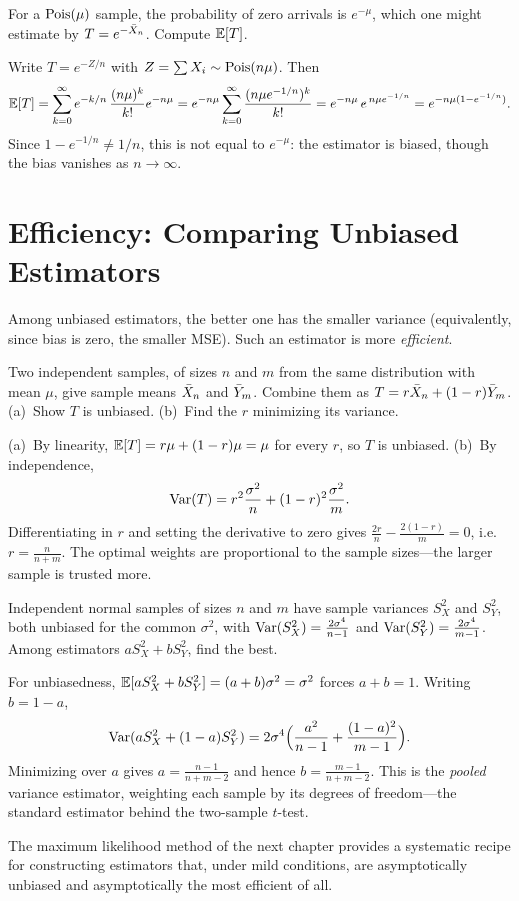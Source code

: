 \begin{example}
For a $\mathrm{Pois}(\mu)$ sample, the probability of zero arrivals is $e^{-\mu}$, which
one might estimate by $T=e^{-\bar{X}_n}$. Compute $\mathbb{E}[T]$.

\solution Write $T=e^{-Z/n}$ with $Z=\sum X_i\sim\mathrm{Pois}(n\mu)$. Then
\[
  \mathbb{E}[T]=\sum_{k=0}^\infty e^{-k/n}\,\frac{(n\mu)^k}{k!}e^{-n\mu}
   =e^{-n\mu}\sum_{k=0}^\infty\frac{(n\mu e^{-1/n})^k}{k!}
   =e^{-n\mu}\,e^{\,n\mu e^{-1/n}}=e^{-n\mu(1-e^{-1/n})}.
\]
Since $1-e^{-1/n}\neq 1/n$, this is not equal to $e^{-\mu}$: the estimator is
biased, though the bias vanishes as $n\to\infty$.
\end{example}

\section{Efficiency: Comparing Unbiased Estimators}

Among unbiased estimators, the better one has the smaller variance (equivalently,
since bias is zero, the smaller MSE). Such an estimator is more \emph{efficient}.

\begin{example}
Two independent samples, of sizes $n$ and $m$ from the same distribution with
mean $\mu$, give sample means $\bar{X}_n$ and $\bar{Y}_m$. Combine them as
$T=r\bar{X}_n+(1-r)\bar{Y}_m$. (a)~Show $T$ is unbiased. (b)~Find the $r$ minimizing
its variance.

\solution (a)~By linearity, $\mathbb{E}[T]=r\mu+(1-r)\mu=\mu$ for every $r$, so $T$ is
unbiased. (b)~By independence,
\[
  \mathrm{Var}(T)=r^2\frac{\sigma^2}{n}+(1-r)^2\frac{\sigma^2}{m}.
\]
Differentiating in $r$ and setting the derivative to zero gives
$\tfrac{2r}{n}-\tfrac{2(1-r)}{m}=0$, i.e.\ $r=\tfrac{n}{n+m}$. The optimal weights
are proportional to the sample sizes—the larger sample is trusted more.
\end{example}

\begin{example}
Independent normal samples of sizes $n$ and $m$ have sample variances $S_X^2$
and $S_Y^2$, both unbiased for the common $\sigma^2$, with
$\mathrm{Var}(S_X^2)=\tfrac{2\sigma^4}{n-1}$ and $\mathrm{Var}(S_Y^2)=\tfrac{2\sigma^4}{m-1}$.
Among estimators $aS_X^2+bS_Y^2$, find the best.

\solution For unbiasedness, $\mathbb{E}[aS_X^2+bS_Y^2]=(a+b)\sigma^2=\sigma^2$ forces
$a+b=1$. Writing $b=1-a$,
\[
  \mathrm{Var}(aS_X^2+(1-a)S_Y^2)=2\sigma^4\Bigl(\frac{a^2}{n-1}+\frac{(1-a)^2}{m-1}\Bigr).
\]
Minimizing over $a$ gives $a=\tfrac{n-1}{n+m-2}$ and hence
$b=\tfrac{m-1}{n+m-2}$. This is the \emph{pooled} variance estimator, weighting
each sample by its degrees of freedom—the standard estimator behind the
two-sample $t$-test.
\end{example}

The maximum likelihood method of the next chapter provides a systematic recipe
for constructing estimators that, under mild conditions, are asymptotically
unbiased and asymptotically the most efficient of all.
